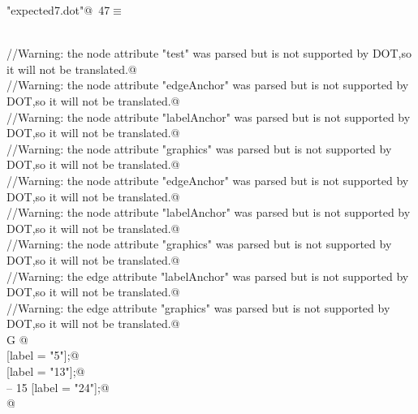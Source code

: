 \documentclass[a4paper]{report}
\begin{document}
\begin{flushleft} \small
\begin{minipage}{\linewidth}\label{scrap47}\raggedright\small
{} \verb@"expected7.dot"@\nobreak\ {\footnotesize {47}}$\equiv$
\vspace{-1ex}
\begin{list}{}{} \item
\mbox{}\verb@@\\
\mbox{}\verb@//Warning: the node attribute "test" was parsed but is not supported by DOT,so it will not be translated.@\\
\mbox{}\verb@//Warning: the node attribute "edgeAnchor" was parsed but is not supported by DOT,so it will not be translated.@\\
\mbox{}\verb@//Warning: the node attribute "labelAnchor" was parsed but is not supported by DOT,so it will not be translated.@\\
\mbox{}\verb@//Warning: the node attribute "graphics" was parsed but is not supported by DOT,so it will not be translated.@\\
\mbox{}\verb@//Warning: the node attribute "edgeAnchor" was parsed but is not supported by DOT,so it will not be translated.@\\
\mbox{}\verb@//Warning: the node attribute "labelAnchor" was parsed but is not supported by DOT,so it will not be translated.@\\
\mbox{}\verb@//Warning: the node attribute "graphics" was parsed but is not supported by DOT,so it will not be translated.@\\
\mbox{}\verb@//Warning: the edge attribute "labelAnchor" was parsed but is not supported by DOT,so it will not be translated.@\\
\mbox{}\verb@//Warning: the edge attribute "graphics" was parsed but is not supported by DOT,so it will not be translated.@\\
\mbox{}\verb@graph G {@\\
\mbox{} [label = "5"];@\\
\mbox{} [label = "13"];@\\
\mbox{} -- 15 [label = "24"];@\\
\mbox{}\verb@}@\\
\mbox{}\verb@@{\NWsep}
\end{list}
\vspace{-1.5ex}
\footnotesize
\begin{list}{}{\setlength{\itemsep}{-\parsep}\setlength{\itemindent}{-\leftmargin}}

\item{}
\end{list}
\end{minipage}\vspace{4ex}
\end{flushleft}
\end{document}
